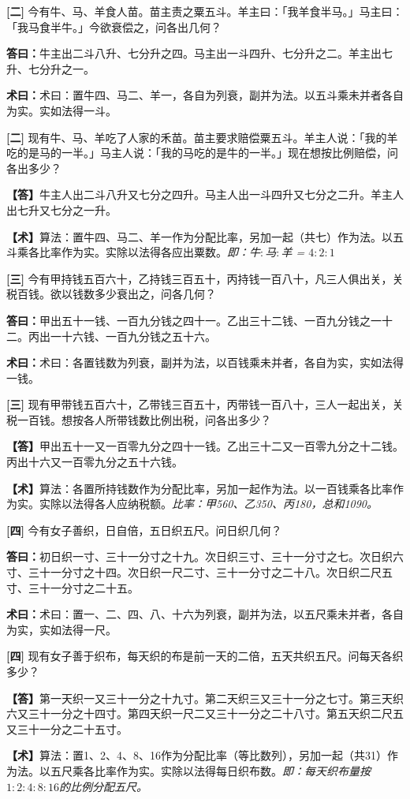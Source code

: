 \documentclass[10pt,a4paper]{article}
\newlength{\lw}
\newlength{\rw}
\newcommand{\bilingc}[2]{%
  \par\vspace{0.1em}%
  \noindent\begin{minipage}[t]{\lw}
  {\small #1}
  \end{minipage}%
  \hfill%
  \begin{minipage}[t]{\rw}
  {\small #2}
  \end{minipage}%
  \vspace{0.1em}%
}
\newcommand{\da}{\textbf{\textcolor{answercolor}{答曰：}}}
\newcommand{\daB}{\textbf{\textcolor{answercolor}{【答】}}}
\newcommand{\shu}{\textbf{\textcolor{methodcolor}{术曰：}}}
\newcommand{\shuB}{\textbf{\textcolor{methodcolor}{【术】}}}
\newcommand{\pn}[1]{\textbf{[#1]}}
\begin{document}
\bilingc{
\pn{二} 今有牛、马、羊食人苗。苗主责之粟五斗。羊主曰：「我羊食半马。」马主曰：「我马食半牛。」今欲衰偿之，问各出几何？

\da 牛主出二斗八升、七分升之四。马主出一斗四升、七分升之二。羊主出七升、七分升之一。

\shu 术曰：置牛四、马二、羊一，各自为列衰，副并为法。以五斗乘未并者各自为实。实如法得一斗。
}{
\pn{二} 现有牛、马、羊吃了人家的禾苗。苗主要求赔偿粟五斗。羊主人说：「我的羊吃的是马的一半。」马主人说：「我的马吃的是牛的一半。」现在想按比例赔偿，问各出多少？

\daB 牛主人出二斗八升又七分之四升。马主人出一斗四升又七分之二升。羊主人出七升又七分之一升。

\shuB 算法：置牛四、马二、羊一作为分配比率，另加一起（共七）作为法。以五斗乘各比率作为实。实除以法得各应出粟数。\textit{即：牛$:$马$:$羊 = $4:2:1$}
}

\vspace{0.3em}

\bilingc{
\pn{三} 今有甲持钱五百六十，乙持钱三百五十，丙持钱一百八十，凡三人俱出关，关税百钱。欲以钱数多少衰出之，问各几何？

\da 甲出五十一钱、一百九分钱之四十一。乙出三十二钱、一百九分钱之一十二。丙出一十六钱、一百九分钱之五十六。

\shu 术曰：各置钱数为列衰，副并为法，以百钱乘未并者，各自为实，实如法得一钱。
}{
\pn{三} 现有甲带钱五百六十，乙带钱三百五十，丙带钱一百八十，三人一起出关，关税一百钱。想按各人所带钱数比例出税，问各出多少？

\daB 甲出五十一又一百零九分之四十一钱。乙出三十二又一百零九分之十二钱。丙出十六又一百零九分之五十六钱。

\shuB 算法：各置所持钱数作为分配比率，另加一起作为法。以一百钱乘各比率作为实。实除以法得各人应纳税额。\textit{比率：甲560、乙350、丙180，总和1090。}
}

\vspace{0.3em}

\bilingc{
\pn{四} 今有女子善织，日自倍，五日织五尺。问日织几何？

\da 初日织一寸、三十一分寸之十九。次日织三寸、三十一分寸之七。次日织六寸、三十一分寸之十四。次日织一尺二寸、三十一分寸之二十八。次日织二尺五寸、三十一分寸之二十五。

\shu 术曰：置一、二、四、八、十六为列衰，副并为法，以五尺乘未并者，各自为实，实如法得一尺。
}{
\pn{四} 现有女子善于织布，每天织的布是前一天的二倍，五天共织五尺。问每天各织多少？

\daB 第一天织一又三十一分之十九寸。第二天织三又三十一分之七寸。第三天织六又三十一分之十四寸。第四天织一尺二又三十一分之二十八寸。第五天织二尺五又三十一分之二十五寸。

\shuB 算法：置1、2、4、8、16作为分配比率（等比数列），另加一起（共31）作为法。以五尺乘各比率作为实。实除以法得每日织布数。\textit{即：每天织布量按$1:2:4:8:16$的比例分配五尺。}
}
\end{document}
